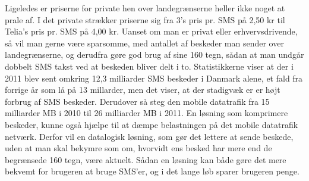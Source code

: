 Ligeledes er priserne for private hen over landegrænserne heller ikke noget at prale af. I det private strækker priserne sig fra 3's pris pr. SMS på 2,50 kr\cite{Pro_4} til Telia's pris pr. SMS på 4,00 kr\cite{Pro_5}. Uanset om man er privat eller erhvervsdrivende, så vil man gerne være sparsomme, med antallet af beskeder man sender over landegrænserne, og derudfra gøre god brug af sine 160 tegn, sådan at man undgår dobbelt SMS takst ved at beskeden bliver delt i to.
Statistikkerne viser at der i 2011 blev sent omkring 12,3 milliarder SMS beskeder i Danmark alene, et fald fra forrige år som lå på 13 millarder, men det viser, at der stadigvæk er er højt forbrug af SMS beskeder. Derudover så steg den mobile datatrafik fra 15 milliarder MB i 2010 til 26 milliarder MB i 2011\cite{Pro_6}. En løsning som komprimere beskeder, kunne også hjælpe til at dæmpe belastningen på det mobile datatrafik netværk.
Derfor vil en  datalogisk løsning, som gør det lettere at sende beskede, uden at man skal bekymre som om, hvorvidt ens besked har mere end de begrænsede 160 tegn, være aktuelt. Sådan en løsning kan både gøre det mere bekvemt for brugeren at bruge SMS'er, og i det lange løb sparer brugeren penge.